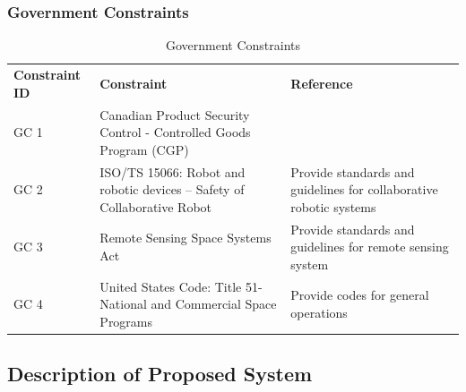 \documentclass[12pt, letter]{article}
\begin{document}
\subsubsection{Government Constraints}
\begin{table}[H]
\label{govt_constraints}
\caption{Government Constraints}
\centering
\begin{tabular}{|P{3cm}|P{6.3cm}|P{6cm}|}
\hline
\textbf{Constraint ID}	&	\textbf{Constraint}										&	\textbf{Reference}	\\\hhline{|=|=|=|}
GC 1				&	Canadian Product Security Control - Controlled Goods Program (CGP)	&					\\\hline
GC 2				&	ISO/TS 15066: Robot and robotic devices -- Safety of Collaborative Robot	&	Provide standards and guidelines for collaborative robotic systems	\\\hline
GC 3				&	Remote Sensing Space Systems Act							&	Provide standards and guidelines for remote sensing system	\\\hline
GC 4				&	United States Code: Title 51- National and Commercial Space Programs	&	Provide codes for general operations	\\\hline
\end{tabular}
\end{table}
\subsection{Description of Proposed System}
\label{description}
\end{document}
